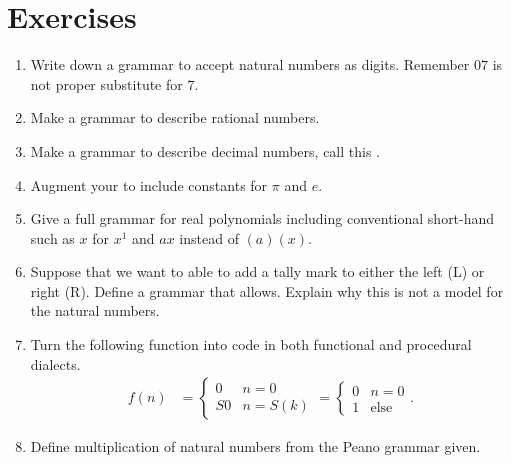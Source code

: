 \section*{Exercises}

\begin{enumerate}
    \item Write down a grammar to accept natural numbers as digits.  Remember $07$ is not proper substitute for $7$.
    \item Make a grammar to describe rational numbers.
    \item Make a grammar to describe decimal numbers, call this .  
    \item Augment your  to include constants for $\pi$ and $e$.
    \item Give a full grammar for real polynomials including conventional short-hand 
    such as $x$ for $x^1$ and $ax$ instead of $(a)(x)$.
    
    \item Suppose that we want to able to add a tally mark to either the left (L) or right (R).
    Define a grammar that allows.  Explain why this is not a model for the natural numbers.
        
    \item Turn the following function into code in both functional and procedural dialects.
    \begin{align*}
        f(n) & = \begin{cases}
                    0 & n=0\\
                    S0 & n=S(k)
        \end{cases}
         =\begin{cases} 0 & n=0 \\ 1 & \text{else}\end{cases}.
    \end{align*}
    
    \item Define multiplication of natural numbers from the Peano grammar given.
\end{enumerate}